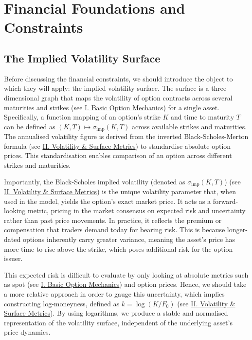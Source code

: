 \documentclass[12pt,oneside]{report}
\theoremstyle{definition}
\theoremstyle{remark}
\begin{document}
\chapter{Financial Foundations and Constraints}

\section{The Implied Volatility Surface}
Before discussing the financial constraints, we should introduce the object to which they will apply: the implied volatility surface. The surface is a three-dimensional graph that maps the volatility of option contracts across several maturities and strikes (see \hyperref[sec:glossary_basic_option_definitions]{I. Basic Option Mechanics}) for a single asset. Specifically, a function mapping of an option’s strike $K$ and time to maturity $T$ can be defined as $(K, T) \mapsto \sigma_{\mathrm{imp}}(K,T)$ across available strikes and maturities. The annualised volatility figure is derived from the inverted Black-Scholes-Merton formula (see \hyperref[sec:glossary_volatility_surface_metrics]{II. Volatility \& Surface Metrics}) to standardise absolute option prices. This standardisation enables comparison of an option across different strikes and maturities.

Importantly, the Black-Scholes implied volatility (denoted as $\sigma_{\mathrm{imp}}(K,T)$) (see \hyperref[sec:glossary_volatility_surface_metrics]{II. Volatility \& Surface Metrics}) is the unique volatility parameter that, when used in the \citet{black1973pricing} model, yields the option’s exact market price. It acts as a forward-looking metric, pricing in the market consensus on expected risk and uncertainty rather than past price movements. In practice, it reflects the premium or compensation that traders demand today for bearing risk. This is because longer-dated options inherently carry greater variance, meaning the asset's price has more time to rise above the strike, which poses additional risk for the option issuer.

This expected risk is difficult to evaluate by only looking at absolute metrics such as spot (see \hyperref[sec:glossary_basic_option_definitions]{I. Basic Option Mechanics}) and option prices. Hence, we should take a more relative approach in order to gauge this uncertainty, which implies constructing log-moneyness, defined as $k = \log(K/F_0)$ (see \hyperref[sec:glossary_volatility_surface_metrics]{II. Volatility \& Surface Metrics}). By using logarithms, we produce a stable and normalised representation of the volatility surface, independent of the underlying asset’s price dynamics.
\end{document}
